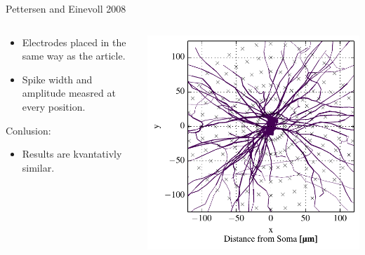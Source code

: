 \documentclass[aspectratio=169]{beamer}
\begin{document}
\begin{frame}{Pettersen and Einevoll 2008}
    \begin{columns}
        \begin{column}{0.48\textwidth}
            \begin{itemize}
                \item Electrodes placed in the same way as the article.
                \item Spike width and amplitude measred at every position.
            \end{itemize}
            Conlusion:
            \begin{itemize}
                \item Results are kvantativly similar. 
            \end{itemize}
        \end{column}
        \begin{column}{0.48\textwidth}
            \begin{center}
                \includegraphics[width=\textwidth]{images/disc_morph_elec_xz.pdf}
            \end{center}
        \end{column}
    \end{columns}
\end{frame}
\end{document}

